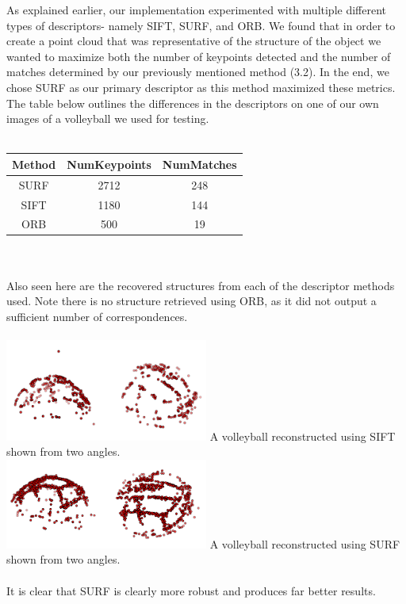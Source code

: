 \documentclass[12pt]{article}
\begin{document}
\begin{multicols}{2}
As explained earlier, our implementation experimented with multiple different types of descriptors- namely SIFT, SURF, and ORB. We found that in order to create a point cloud that was representative of the structure of the object we wanted to maximize both the number of keypoints detected and the number of matches determined by our previously mentioned method (3.2). In the end, we chose SURF as our primary descriptor as this method maximized these metrics. The table below outlines the differences in the descriptors on one of our own images of a volleyball we used for testing. \\\\	
\begin{tabular}{c c c} 
\hline\hline 
Method & NumKeypoints & NumMatches \\ 
\hline 
SURF & 2712 & 248 \\ 
SIFT & 1180 & 144 \\ 
ORB & 500 & 19 \\ 
\hline\hline 
\end{tabular}
\\\\
\indent Also seen here are the recovered structures from each of the descriptor methods used. Note there is no structure retrieved using ORB, as it did not output a sufficient number of correspondences. \\\\
\includegraphics[width=0.5\textwidth]{images/VBallMediumSift_SideBySide.png}
A volleyball reconstructed using SIFT shown from two angles. \\
\includegraphics[width=0.5\textwidth]{images/VBallMediumSurf_SideBySide.png}
A volleyball reconstructed using SURF shown from two angles.\\\\
It is clear that SURF is clearly more robust and produces far better results.\\\\

\end{multicols}
\end{document}
